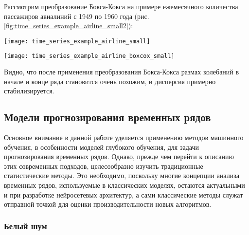 Рассмотрим преобразование Бокса-Кокса на примере ежемесячного 
количества пассажиров авиалиний с 1949 по 1960 года (рис. \ref{fig:time_series_example_airline_small2}):

\begin{center}
    \begin{minipage}{0.45\textwidth}
        \centering
        \texttt{[image: time\_series\_example\_airline\_small]}
        \label{fig:time_series_example_airline_small2}
    \end{minipage}
    \hfill
    \begin{minipage}{0.45\textwidth}
        \centering
        \texttt{[image: time\_series\_example\_airline\_boxcox\_small]}
        \label{fig:time_series_example_airline_boxcox_small}
    \end{minipage}
\end{center}

Видно, что после применения преобразования Бокса-Кокса размах колебаний в начале и
конце ряда становится очень похожим, и дисперсия примерно стабилизируется. 

\subsection{Модели прогнозирования временных рядов}

Основное внимание в данной работе уделяется применению методов 
машинного обучения, в особенности моделей глубокого обучения, 
для задачи прогнозирования временных рядов. Однако, прежде чем перейти к 
описанию этих современных подходов, целесообразно изучить традиционные 
статистические методы. Это необходимо, поскольку многие концепции 
анализа временных рядов, используемые в классических моделях, 
остаются актуальными и при разработке нейросетевых архитектур, а 
сами классические методы служат отправной точкой для оценки 
производительности новых алгоритмов.

\subsubsection{Белый шум}

